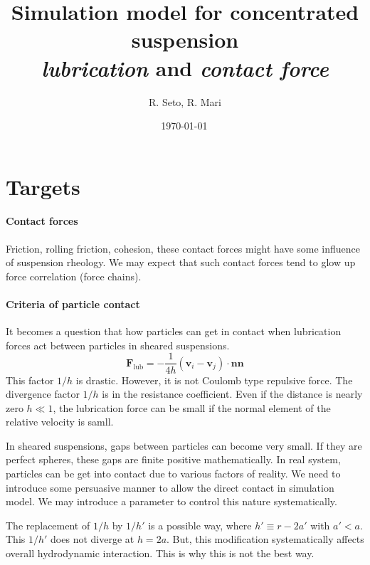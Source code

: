 \documentclass[11pt]{scrartcl}
\title{Simulation model for concentrated suspension\\
\emph{lubrication} and \emph{contact force}}
\date{\shortdate\today \, \ampmtime }
\author{R. Seto, R. Mari}
\begin{document}
\maketitle

\section{Targets}

\paragraph{Contact forces}

Friction, rolling friction, cohesion,
these contact forces might have some influence 
of suspension rheology.
%
We may expect that
such contact forces tend to glow up
force correlation (force chains).
%

\paragraph{Criteria of particle contact}

It becomes a question that how 
particles can get in contact 
when lubrication forces act between particles in sheared suspensions.
%
\begin{equation}
\bm{F}_{\mathrm{lub}} = -\frac{1}{4h} (\bm{v}_i-\bm{v}_j)\cdot\bm{n}\bm{n}
\end{equation}
%
This factor $1/h$ is drastic.
%
However, it is not Coulomb type repulsive force.
%
The divergence factor $1/h$
is in the resistance coefficient.
%
Even if the distance is nearly zero $h \ll 1$,
the lubrication force can be small
if the normal element of the relative velocity is samll.
%

In sheared suspensions,
gaps between particles can become very small.
%
If they are perfect spheres,
these gaps are finite positive mathematically.
%
In real system, particles can be get into contact
due to various factors of reality.
%
We need to introduce some persuasive manner 
to allow the direct contact in simulation model.
%
We may introduce a parameter to control this nature systematically.
%


The replacement of $1/h$ by $1/h'$ is a possible way,
where $h' \equiv r - 2a' $ with $a' < a$.
%
This $ 1/h'$ does not diverge at $h=2a$.
%
But, this modification systematically
affects overall hydrodynamic interaction.
%
This is why this is not the best way.
%
\end{document}
